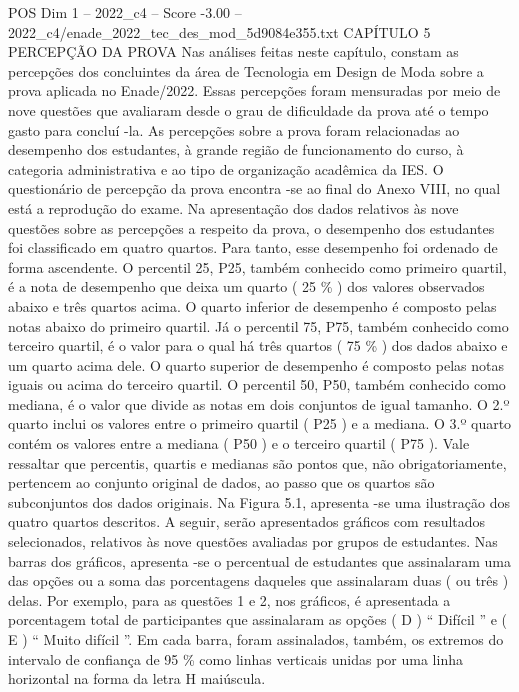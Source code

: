 \begin{textsample}{POS Dim 1 – 2022\_c4 – Score -3.00 – 2022\_c4/enade\_2022\_tec\_des\_mod\_5d9084e355.txt}  \label{ex:f1_pos_255}
CAPÍTULO 5 PERCEPÇÃO DA PROVA Nas análises feitas neste capítulo, constam as percepções dos concluintes da área de Tecnologia em Design de Moda sobre a prova aplicada no Enade/2022.
Essas percepções foram mensuradas por meio de nove questões que avaliaram desde o grau de dificuldade da prova até o tempo gasto para concluí -la.
As percepções sobre a prova foram relacionadas ao desempenho dos estudantes, à grande região de funcionamento do curso, à categoria administrativa e ao tipo de organização acadêmica da IES.
O questionário de percepção da prova encontra -se ao final do Anexo VIII, no qual está a reprodução do exame.
Na apresentação dos dados relativos às nove questões sobre as percepções a respeito da prova, o desempenho dos estudantes foi classificado em quatro quartos.
Para tanto, esse desempenho foi ordenado de forma ascendente.
O percentil 25, P25, também conhecido como primeiro quartil, é a nota de desempenho que deixa um quarto ( 25 \% ) dos valores observados abaixo e três quartos acima.
O quarto inferior de desempenho é composto pelas notas abaixo do primeiro quartil.
Já o percentil 75, P75, também conhecido como terceiro quartil, é o valor para o qual há três quartos ( 75 \% ) dos dados abaixo e um quarto acima dele.
O quarto superior de desempenho é composto pelas notas iguais ou acima do terceiro quartil.
O percentil 50, P50, também conhecido como mediana, é o valor que divide as notas em dois conjuntos de igual tamanho.
O 2.º quarto inclui os valores entre o primeiro quartil ( P25 ) e a mediana.
O 3.º quarto contém os valores entre a mediana ( P50 ) e o terceiro quartil ( P75 ).
Vale ressaltar que percentis, quartis e medianas são pontos que, não obrigatoriamente, pertencem ao conjunto original de dados, ao passo que os quartos são subconjuntos dos dados originais.
Na Figura 5.1, apresenta -se uma ilustração dos quatro quartos descritos.
A seguir, serão apresentados gráficos com resultados selecionados, relativos às nove questões avaliadas por grupos de estudantes.
Nas barras dos gráficos, apresenta -se o percentual de estudantes que assinalaram uma das opções ou a soma das porcentagens daqueles que assinalaram duas ( ou três ) delas.
Por exemplo, para as questões 1 e 2, nos gráficos, é apresentada a porcentagem total de participantes que assinalaram as opções ( D ) “ Difícil ” e ( E ) “ Muito difícil ”.
Em cada barra, foram assinalados, também, os extremos do intervalo de confiança de 95 \% como linhas verticais unidas por uma linha horizontal na forma da letra H maiúscula.

\end{textsample}
